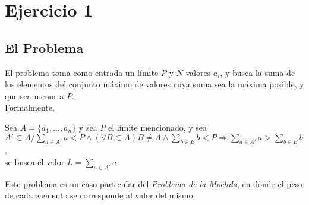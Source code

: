 \section{Ejercicio 1}
\subsection{El Problema}
El problema toma como entrada un límite $P$ y $N$ valores $a_{i}$, y busca la suma de los elementos del conjunto máximo de valores cuya suma sea la máxima posible, y que sea menor a $P$.\\
Formalmente, \\
\begin{center}
Sea $A = \{a_{1},...,a_{n}\}$ y sea $P$ el límite mencionado, y sea $A' \subset A / \displaystyle\sum_{a \in A'} a < P \wedge (\forall B \subset A) B \neq A \wedge \displaystyle\sum_{b \in B} b < P \Rightarrow \displaystyle\sum_{a \in A'} a > \displaystyle\sum_{b \in B} b$, \\se busca el valor $L = \displaystyle\sum_{a \in A'} a$
\end{center}
Este problema es un caso particular del \emph{Problema de la Mochila\textsuperscript{\cite{knapp}}}, en donde el peso de cada elemento se corresponde al valor del mismo.


